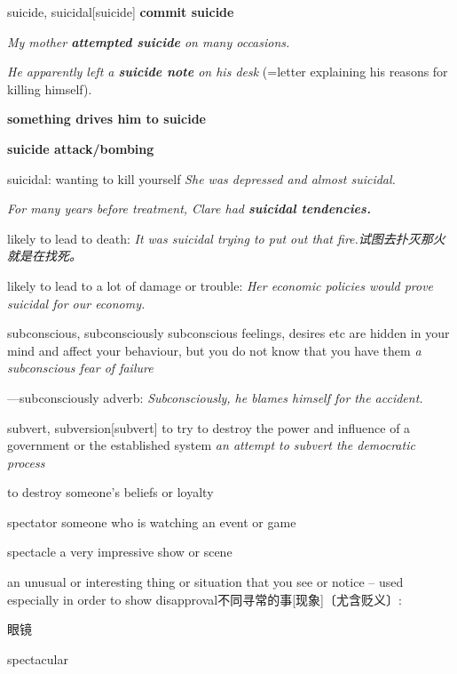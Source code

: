 \begin{DefWord}{suicide, suicidal}[suicide]
    \textbf{commit suicide}

    \textit{My mother \textbf{attempted suicide} on many occasions.}

    \textit{He apparently left a \textbf{suicide note} on his desk} (=letter explaining his reasons for killing himself).

    \textbf{something drives him to suicide}

    \textbf{suicide attack/bombing}

    suicidal: 
    wanting to kill yourself
    \textit{She was depressed and almost suicidal.}

    \textit{For many years before treatment, Clare had \textbf{suicidal tendencies.}}

    likely to lead to death:
    \textit{It was suicidal trying to put out that fire.试图去扑灭那火就是在找死。}

    likely to lead to a lot of damage or trouble: 
    \textit{Her economic policies would prove suicidal for our economy.}
\end{DefWord}

\begin{DefWord}{subconscious, subconsciously}
    subconscious feelings, desires etc are hidden in your mind and affect your behaviour, but you do not know that you have them
    \textit{a subconscious fear of failure}

    —subconsciously adverb:
    \textit{Subconsciously, he blames himself for the accident.}
\end{DefWord}

\begin{DefWord}{subvert, subversion}[subvert]
    to try to destroy the power and influence of a government or the established system
    \textit{an attempt to subvert the democratic process}

    to destroy someone’s beliefs or loyalty
\end{DefWord}

\begin{DefWord}{spectator}
    someone who is watching an event or game


\end{DefWord}

\begin{DefWord}{spectacle}
    a very impressive show or scene

    an unusual or interesting thing or situation that you see or notice – used especially in order to show disapproval不同寻常的事[现象]〔尤含贬义〕:

    眼镜
\end{DefWord}

\begin{DefWord}{spectacular}
\end{DefWord}